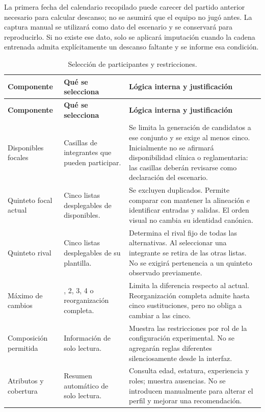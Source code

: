 La primera fecha del calendario recopilado puede carecer del partido anterior necesario para calcular descanso; no se asumirá que el equipo no jugó antes. La captura manual se utilizará como dato del escenario y se conservará para reproducirlo. Si no existe ese dato, solo se aplicará imputación cuando la cadena entrenada admita explícitamente un descanso faltante y se informe esa condición.

\begingroup\small{}\setlength{\tabcolsep}{4pt}
\begin{longtable}{@{}>{\raggedright\arraybackslash}p{3.0cm}>{\raggedright\arraybackslash}p{3.1cm}>{\raggedright\arraybackslash}p{8.5cm}@{}}
\caption{Selección de participantes y restricciones.}\label{tab:controles-participantes}\\
\toprule\textbf{Componente}&\textbf{Qué se selecciona}&\textbf{Lógica interna y justificación}\\\midrule\endfirsthead
\toprule\textbf{Componente}&\textbf{Qué se selecciona}&\textbf{Lógica interna y justificación}\\\midrule\endhead
\bottomrule\endfoot
Disponibles focales & Casillas de integrantes que pueden participar. & Se limita la generación de candidatos a ese conjunto y se exige al menos cinco. Inicialmente no se afirmará disponibilidad clínica o reglamentaria: las casillas deberán revisarse como declaración del escenario.\\
Quinteto focal actual & Cinco listas desplegables de disponibles. & Se excluyen duplicados. Permite comparar con mantener la alineación e identificar entradas y salidas. El orden visual no cambia su identidad canónica.\\
Quinteto rival & Cinco listas desplegables de su plantilla. & Determina el rival fijo de todas las alternativas. Al seleccionar una integrante se retira de las otras listas. No se exigirá pertenencia a un quinteto observado previamente.\\
Máximo de cambios & 1, 2, 3, 4 o reorganización completa. & Limita la diferencia respecto al actual. Reorganización completa admite hasta cinco sustituciones, pero no obliga a cambiar a las cinco.\\
Composición permitida & Información de solo lectura. & Muestra las restricciones por rol de la configuración experimental. No se agregarán reglas diferentes silenciosamente desde la interfaz.\\
Atributos y cobertura & Resumen automático de solo lectura. & Consulta edad, estatura, experiencia y roles; muestra ausencias. No se introducen manualmente para alterar el perfil y mejorar una recomendación.\\
\end{longtable}\endgroup


